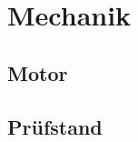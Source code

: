 \chapter{Mechanik}
\label{ch:MECH}

\section{Motor}
\label{sec:MECH_motor}

\section{Prüfstand}
\label{sec:MECH_pruefstand}


	
		